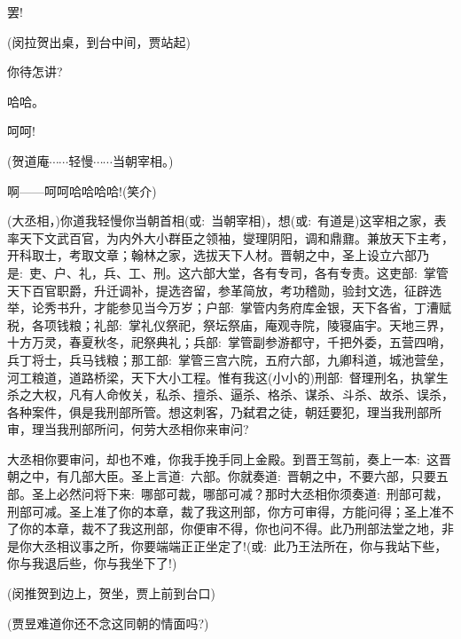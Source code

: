 {

罢!


(闵{\hwfs 拉}贺{\hwfs 出桌}，{\hwfs 到台中间}，贾{\hwfs 站起})


你待怎讲?

哈哈。

呵呵!

(贺道庵\hspace{20pt}$\cdots{}\cdots{}$轻慢$\cdots{}\cdots{}$当朝宰相。)

啊------呵呵哈哈哈哈!({\hwfs 笑介})

(大丞相，)你道我轻慢你当朝首相({\akai 或}:~当朝宰相)，想({\akai 或}:~有道是)这宰相之家，表率天下文武百官，为内外大小群臣之领袖，燮理阴阳，调和鼎鼐。兼放天下主考，开科取士，考取文章；翰林之家，选拔天下人材。晋朝之中，圣上设立六部乃是:~吏、户、礼，兵、工、刑。这六部大堂，各有专司，各有专责。这吏部:~掌管天下百官职爵，升迁调补，提选咨留，参革简放，考功稽勋，验封文选，征辟选举，论秀书升，才能参见当今万岁；户部:~掌管内务府库金银，天下各省，丁漕赋税，各项钱粮；礼部:~掌礼仪祭祀，祭坛祭庙，庵观寺院，陵寝庙宇。天地三界，十方万灵，春夏秋冬，祀祭典礼；兵部:~掌管副参游都守，千把外委，五营四哨，兵丁将士，兵马钱粮；那工部:~掌管三宫六院，五府六部，九卿科道，城池营垒，河工粮道，道路桥梁，天下大小工程。惟有我这(小小的)刑部:~督理刑名，执掌生杀之大权，凡有人命攸关，私杀、擅杀、逼杀、格杀、谋杀、斗杀、故杀、误杀，各种案件，俱是我刑部所管。想这刺客，乃弑君之徒，朝廷要犯，理当我刑部所审，理当我刑部所问，何劳大丞相你来审问?

大丞相你要审问，却也不难，你我手挽手同上金殿。到晋王驾前，奏上一本:~这晋朝之中，有几部大臣。圣上言道:~六部。你就奏道:~晋朝之中，不要六部，只要五部。圣上必然问将下来:~哪部可裁，哪部可减？那时大丞相你须奏道:~刑部可裁，刑部可减。圣上准了你的本章，裁了我这刑部，你方可审得，方能问得；圣上准不了你的本章，裁不了我这刑部，你便审不得，你也问不得。此乃刑部法堂之地，非是你大丞相议事之所，你要端端正正坐定了!({\akai 或}:~此乃王法所在，你与我站下些，你与我退后些，你与我坐下了!)

(闵{\hwfs 推}贺{\hwfs 到边上}，贺{\hwfs 坐}，贾{\hwfs 上前到台口})

(贾昱\hspace{30pt}难道你还不念这同朝的情面吗?)

}

